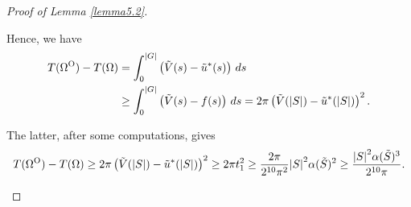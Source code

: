 \documentclass[oneside,a4paper,11pt,notitlepage]{article}
\newcommand{\abs}[1]{{\left|#1\right|}}
\theoremstyle{definition}
\theoremstyle{plain}
\theoremstyle{definition}
\newcommand{\OO}{\text{\normalfont  O}}
\begin{document}
\begin{proof}[Proof of Lemma \ref{lemma5.2}]
\begin{itemize}
         Hence, we have 
         \begin{equation}
             \label{claimbho}
             \begin{aligned}
                 T(\Omega^\OO)-T(\Omega)&=\int _0^{\abs{G}} \left(\tilde V(s)-\tilde u^\ast(s)\right)\, ds \\
                 &\geq \int _0^{\abs{G}} \left(\tilde V(s)-f(s)\right)\, ds= 2 \pi \left(\tilde V(\abs{S})-\tilde u^\ast(\abs{S})\right)^2.
             \end{aligned}
             \end{equation} 

             The latter, after some computations,  gives
              \begin{equation*}
             T(\Omega^\OO)-T(\Omega)\geq 2 \pi \left(\tilde V(\abs{S})-\tilde u^\ast(\abs{S})\right)^2\geq 2 \pi t_1^2\geq \frac{2 \pi}{2^{10} \pi^2}\abs{S}^2\alpha(\tilde{S})^2\geq \frac{\abs{S}^2\alpha(\tilde{S})^3}{2^{10} \pi}.
         \end{equation*}
         
         
    \end{itemize}
      \begin{figure}[ht!]
        \centering
        



\begin{tikzpicture}[x=0.75pt,y=0.75pt,yscale=-1,xscale=1]


\end{tikzpicture}
\end{figure}
\end{proof}
\end{document}
